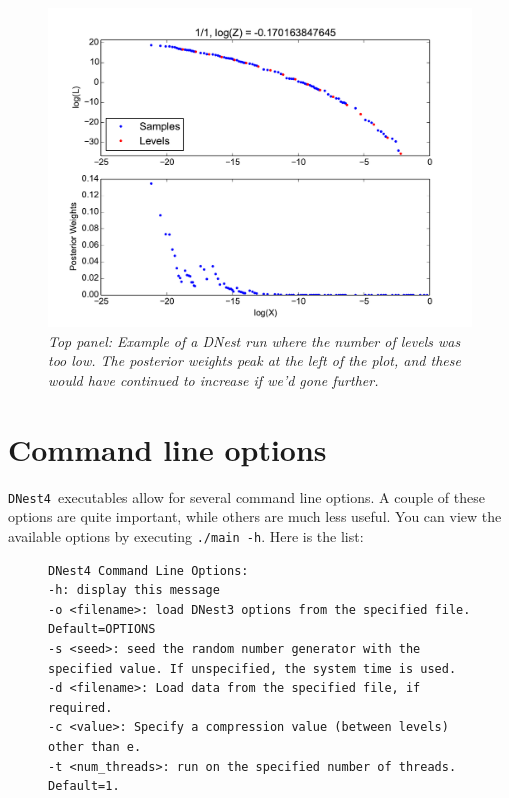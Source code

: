 \documentclass[a4paper, 11pt]{article}
\newcommand{\dnest}{{\tt DNest4}}
\begin{document}
\begin{figure}
\begin{center}
\includegraphics[scale=0.5]{not_enough_levels.pdf}
\caption{\it Top panel: Example of a DNest run where the number of levels
was too low. The posterior weights peak at the left of the plot, and these
would have continued to increase if we'd gone further.
\label{fig:not_enough_levels}}
\end{center}
\end{figure}

\section{Command line options}\label{sec:commandline}
\dnest~executables allow for several command line options. A couple of these
options are quite important, while others are much less useful.
You can view the available options by executing
{\tt ./main -h}. Here is the list:\\

\begin{figure}
\begin{framed}
\begin{verbatim}
DNest4 Command Line Options: 
-h: display this message
-o <filename>: load DNest3 options from the specified file. Default=OPTIONS
-s <seed>: seed the random number generator with the specified value. If unspecified, the system time is used.
-d <filename>: Load data from the specified file, if required.
-c <value>: Specify a compression value (between levels) other than e.
-t <num_threads>: run on the specified number of threads. Default=1.
\end{verbatim}
\end{framed}
\end{figure}
\end{document}
